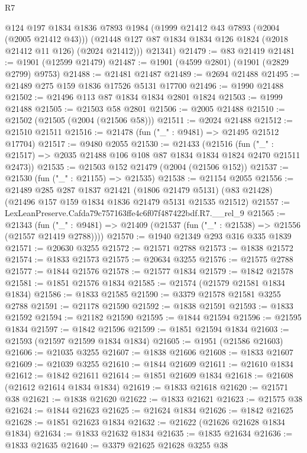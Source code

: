 \begin{lexlean}{R7}
\begin{coremodule}
        @124
        @197
        @1834
        @1836
        @7893
        @1984
        (@1999 @21412 @43 @7893 (@2004 (@2005 @21412 @43)))
        (@21448 @127 @87 @1834 @1834 @126 @1824 (@2018 @21412 @11 @126) (@2024 @21412)))
      @21341)
@21479 := @83 @21419
@21481 := @1901 (@12599 @21479)
@21487 := @1901 (@4599 @2801) (@1901 (@2829 @2799) @9753)
@21488 := @21481 @21487
@21489 := @2694 @21488
@21495 := @21489 @275 @159 @1836 @17526 @5131 @17700
@21496 := @1990 @21488
@21502 := @21496 @113 @87 @1834 @1834 @2801 @1824
@21503 := @1999 @21488
@21505 := @21503 @58 @2801
@21506 := @2005 @21488
@21510 := @21502 (@21505 (@2004 (@21506 @58)))
@21511 := @2024 @21488
@21512 := @21510 @21511
@21516 := @21478 (fun ("_" : @9481) => @21495 @21512 @17704)
@21517 := @9480 @2055
@21530 := @21433
    (@21516 (fun ("_" : @21517) => @2035 @21488 @106 @108 @87 @1834 @1834 @1824 @2470 @21511 @2473))
@21535 := @21503 @152 @21479 (@2004 (@21506 @152))
@21537 := @21530 (fun ("_" : @21155) => @21535)
@21538 := @21154 @2055
@21556 := @21489
    @285
    @287
    @1837
    @21421
    (@1806 @21479 @5131)
    (@83 @21428)
    (@21496 @157 @159 @1834 @1836 @21479 @5131 @21535 @21512)
@21557 := LexLeanPreserve.Cafda79c757163ffe4c6f07f487422bdf.R7.__rel_9
@21565 := @21343
    (fun ("_" : @9481) => @21409 (@21537 (fun ("_" : @21538) => @21556 (@21557 @21419 @2788))))
@21570 := @1940 @21349 @293 @316 @335 @1839
@21571 := @20630 @3255
@21572 := @21571 @2788
@21573 := @1838 @21572
@21574 := @1833 @21573
@21575 := @20634 @3255
@21576 := @21575 @2788
@21577 := @1844 @21576
@21578 := @21577 @1834
@21579 := @1842 @21578
@21581 := @1851 @21576 @1834
@21585 := @21574 (@21579 @21581 @1834 @1834)
@21586 := @1833 @21585
@21590 := @3379 @21578 @21581 @3255 @2788
@21591 := @21178 @21590
@21592 := @1838 @21591
@21593 := @1833 @21592
@21594 := @21182 @21590
@21595 := @1844 @21594
@21596 := @21595 @1834
@21597 := @1842 @21596
@21599 := @1851 @21594 @1834
@21603 := @21593 (@21597 @21599 @1834 @1834)
@21605 := @1951 (@21586 @21603)
@21606 := @21035 @3255
@21607 := @1838 @21606
@21608 := @1833 @21607
@21609 := @21039 @3255
@21610 := @1844 @21609
@21611 := @21610 @1834
@21612 := @1842 @21611
@21614 := @1851 @21609 @1834
@21618 := @21608 (@21612 @21614 @1834 @1834)
@21619 := @1833 @21618
@21620 := @21571 @38
@21621 := @1838 @21620
@21622 := @1833 @21621
@21623 := @21575 @38
@21624 := @1844 @21623
@21625 := @21624 @1834
@21626 := @1842 @21625
@21628 := @1851 @21623 @1834
@21632 := @21622 (@21626 @21628 @1834 @1834)
@21634 := @1833 @21632 @1834
@21635 := @1835 @21634
@21636 := @1833 @21635
@21640 := @3379 @21625 @21628 @3255 @38

\end{coremodule}
\end{lexlean}
